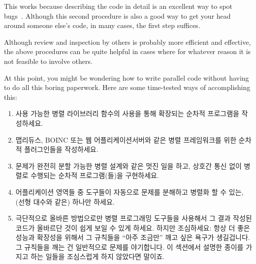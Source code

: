 This works because describing the code in detail is an excellent way to spot
bugs~\cite{GlenfordJMyers1979}.
Although this second procedure is also a good way to get your head around
someone else's code, in many cases, the first step suffices.

Although review and inspection by others is probably more efficient and
effective, the above procedures can be quite helpful in cases where
for whatever reason it is not feasible to involve others.

At this point, you might be wondering how to write parallel code without
having to do all this boring paperwork.
Here are some time-tested ways of accomplishing this:
\fi

\begin{enumerate}
\item	사용 가능한 병렬 라이브러리 함수의 사용을 통해 확장되는 순차적
	프로그램을 작성하세요.
\item	맵리듀스, BOINC 또는 웹 어플리케이션서버와 같은 병렬 프레임워크를 위한
	순차적 플러그인들을 작성하세요.
\item	문제가 완전히 분할 가능한 병렬 설계와 같은 멋진 일을 하고, 상호간 통신
	없이 병렬로 수행되는 순차적 프로그램(들)을 구현하세요.
\item	어플리케이션 영역들 중 도구들이 자동으로 문제를 분해하고 병렬화 할 수
	있는, (선형 대수와 같은) 하나만 하세요.
\item	극단적으로 올바른 방법으로만 병렬 프로그래밍 도구들을 사용해서 그 결과
	작성된 코드가 올바르단 것이 쉽게 보일 수 있게 하세요.
	하지만 조심하세요: 항상 더 좋은 성능과 확장성을 위해서 그 규칙들을
	``아주 조금만'' 깨고 싶은 욕구가 생길겁니다.
	그 규칙들을 깨는 건 일반적으로 문제를 야기합니다.
	이 섹션에서 설명한 종이를 가지고 하는 일들을 조심스럽게 하지 않았다면
	말이죠.

\end{enumerate}

